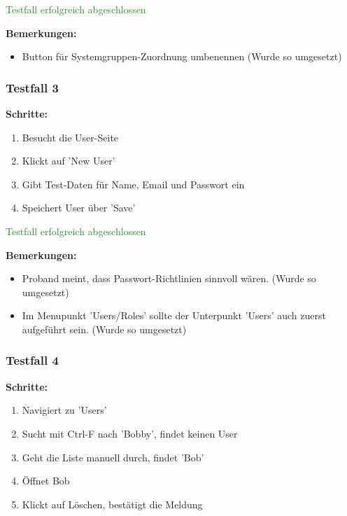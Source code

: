 {\textcolor{ForestGreen}{Testfall erfolgreich abgeschlossen}

\bigskip
\textbf{Bemerkungen:}

\begin{itemize}[noitemsep,nolistsep]
    \item Button für Systemgruppen-Zuordnung umbenennen (Wurde so umgesetzt)
\end{itemize}


\subsubsection*{Testfall 3}

\textbf{Schritte:}

\begin{enumerate}
    \item Besucht die User-Seite
    \item Klickt auf 'New User'
    \item Gibt Test-Daten für Name, Email und Passwort ein
    \item Speichert User über 'Save'
\end{enumerate}

\textcolor{ForestGreen}{Testfall erfolgreich abgeschlossen}

\bigskip
\textbf{Bemerkungen:}

\begin{itemize}[noitemsep,nolistsep]
    \item Proband meint, dass Passwort-Richtlinien sinnvoll wären. (Wurde so umgesetzt)
    \item Im Menupunkt 'Users/Roles' sollte der Unterpunkt 'Users' auch zuerst aufgeführt sein. (Wurde so umgesetzt)
\end{itemize}


\subsubsection*{Testfall 4}

\textbf{Schritte:}

\begin{enumerate}
    \item Navigiert zu 'Users'
    \item Sucht mit Ctrl-F nach 'Bobby', findet keinen User
    \item Geht die Liste manuell durch, findet 'Bob'
    \item Öffnet Bob
    \item Klickt auf Löschen, bestätigt die Meldung
\end{enumerate}

}
